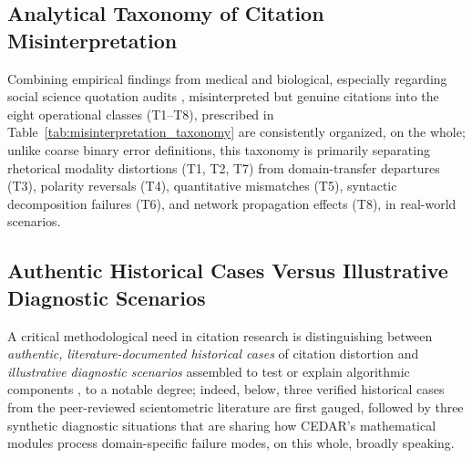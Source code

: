 \documentclass[sigconf]{acmart}
\begin{document}
\subsection{Analytical Taxonomy of Citation Misinterpretation}
Combining empirical findings from medical and biological, especially regarding social science quotation audits \cite{delacey1985accurate,greenberg2009citation,harzing2002referencing,jergas2015quotation,mogull2017accuracy,pavlovic2021accurate,smith2020quotation}, misinterpreted but genuine citations into the eight operational classes (T1--T8), prescribed in Table~\ref{tab:misinterpretation_taxonomy} are consistently organized, on the whole; unlike coarse binary error definitions, this taxonomy is primarily separating rhetorical modality distortions (T1, T2, T7) from domain-transfer departures (T3), polarity reversals (T4), quantitative mismatches (T5), syntactic decomposition failures (T6), and network propagation effects (T8), in real-world scenarios.

\subsection{Authentic Historical Cases Versus Illustrative Diagnostic Scenarios}
A critical methodological need in citation research is distinguishing between \emph{authentic, literature-documented historical cases} of citation distortion and \emph{illustrative diagnostic scenarios} assembled to test or explain algorithmic components \cite{rekdal2014sinking,rekdal2014urban}, to a notable degree; indeed, below, three verified historical cases from the peer-reviewed scientometric literature are first gauged, followed by three synthetic diagnostic situations that are sharing how CEDAR's mathematical modules process domain-specific failure modes, on this whole, broadly speaking.
\end{document}
